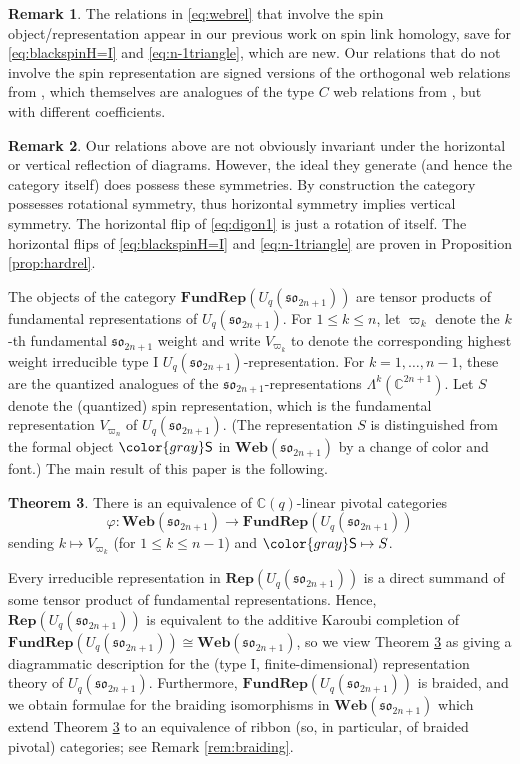 \documentclass[10pt]{amsart}
\newcommand{\gray}[1]{{\color{gray}#1}}
\numberwithin{equation}{section}
\theoremstyle{definition}
\newtheorem{thm}{Theorem}[section]
\newtheorem{rem}[thm]{Remark}
\renewcommand{\to}{\rightarrow}
\def\C{{\mathbb C}}
\newcommand{\son}[1][2n+1]{\mathfrak{so}_{#1}}
\newcommand{\Rep}{\mathbf{Rep}}
\newcommand{\FRep}{\mathbf{FundRep}}
\newcommand{\Web}{\mathbf{Web}}
\newcommand{\gS}{\gray{\mathsf{S}}}
\begin{document}
\begin{rem}\label{rem:rels}
The relations in \eqref{eq:webrel} that involve the spin object/representation appear in our 
previous work \cite{BER} on spin link homology,
save for \eqref{eq:blackspinH=I} and \eqref{eq:n-1triangle}, which are new. 
Our relations that do not involve the spin representation are
signed versions of the orthogonal web relations from \cite{BodWu},
which themselves are analogues of the type $C$ web relations from \cite{BERT},
but with different coefficients.
	\end{rem}

\begin{rem} 
Our relations above are not obviously invariant under 
the horizontal or vertical reflection of diagrams.
However, the ideal they generate (and hence the category itself) 
does possess these symmetries. 
By construction the category possesses rotational symmetry, 
thus horizontal symmetry implies vertical symmetry. 
The horizontal flip of \eqref{eq:digon1} is just a rotation of itself. 
The horizontal flips of \eqref{eq:blackspinH=I} and \eqref{eq:n-1triangle} 
are proven in Proposition \ref{prop:hardrel}. 
\end{rem}

The objects of the category $\FRep(U_q(\son))$ 
are tensor products of fundamental representations 
 of $U_q(\son)$. 
 For $1 \leq k \leq n$, let $\varpi_k$ denote the $k$-th fundamental $\son$ weight 
 and write $V_{\varpi_k}$ to denote the corresponding highest weight irreducible type I $U_q(\son)$-representation. 
For $k=1, \dots, n-1$, these are the quantized analogues of the $\son$-representations $\Lambda^k(\C^{2n+1})$. 
Let $S$ denote the (quantized) spin representation, 
which is the fundamental representation $V_{\varpi_n}$ of $U_q(\son)$. 
(The representation $S$ is distinguished from the formal object $\gS$ in $\Web(\son)$ 
by a change of color and font.) 
The main result of this paper is the following.

\begin{thm} \label{thm:main}
There is an equivalence of $\C(q)$-linear pivotal categories 
\[
\varphi \colon \Web(\son) \to \FRep(U_q(\son))
\]
sending $k \mapsto V_{\varpi_k}$ (for $1 \le k \le n-1$) and $\gS \mapsto S$.
\end{thm}

Every irreducible representation in $\Rep(U_q(\son))$ is a direct summand of some tensor product 
of fundamental representations. 
Hence, $\Rep(U_q(\son))$ is equivalent to the additive 
Karoubi completion of $\FRep(U_q(\son)) \cong \Web(\son)$, 
so we view Theorem \ref{thm:main} as giving a diagrammatic description for the 
(type I, finite-dimensional) representation theory of $U_q(\son)$.
Furthermore, $\FRep(U_q(\son))$ is braided, and we obtain formulae for the 
braiding isomorphisms in $\Web(\son)$ which extend Theorem \ref{thm:main}
to an equivalence of ribbon (so, in particular, of braided pivotal) categories;
see Remark \ref{rem:braiding}.
\end{document}
